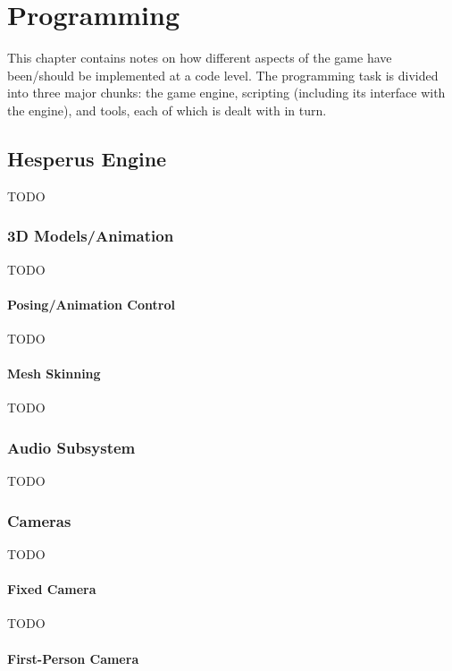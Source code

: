 \chapter{Programming}

This chapter contains notes on how different aspects of the game have been/should be implemented at a code level. The programming task is divided into three major chunks: the game engine, scripting (including its interface with the engine), and tools, each of which is dealt with in turn.

\section{Hesperus Engine}

TODO

\subsection{3D Models/Animation}

TODO

\subsubsection{Posing/Animation Control}

TODO

\subsubsection{Mesh Skinning}

TODO

\subsection{Audio Subsystem}

TODO

\subsection{Cameras}

TODO

\subsubsection{Fixed Camera}

TODO

\subsubsection{First-Person Camera}

